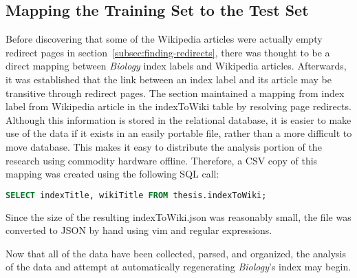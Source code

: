 \subsection{Mapping the Training Set to the Test Set}
\label{sec:indexToWiki}

Before discovering that some of the Wikipedia articles were actually empty redirect pages in section~\ref{subsec:finding-redirects}, there was thought to be a direct mapping between {\it Biology} index labels and Wikipedia articles.
Afterwards, it was established that the link between an index label and its article may be transitive through redirect pages.
The section maintained a mapping from index label from Wikipedia article in the indexToWiki table by resolving page redirects.
Although this information is stored in the relational database, it is easier to make use of the data if it exists in an easily portable file, rather than a more difficult to move database.
This makes it easy to distribute the analysis portion of the research using commodity hardware offline.
Therefore, a CSV copy of this mapping was created using the following SQL call:
\begin{lstlisting}[language=SQL]
SELECT indexTitle, wikiTitle FROM thesis.indexToWiki;
\end{lstlisting}
\noindent Since the size of the resulting indexToWiki.json was reasonably small, the file was converted to JSON by hand using vim and regular expressions.

Now that all of the data have been collected, parsed, and organized, the analysis of the data and attempt at automatically regenerating {\it Biology}'s index may begin.
